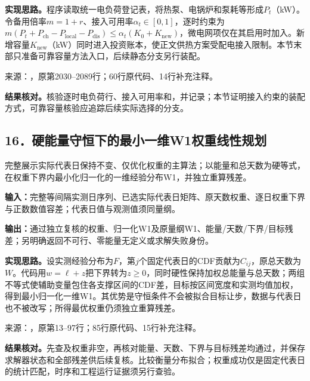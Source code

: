 \noindent\textbf{实现思路。}程序读取统一电负荷登记表，将热泵、电锅炉和泵耗等形成$P_t$（kW）。令备用倍率$m=1+r$、接入可用率$\alpha_t\in[0,1]$，逐时约束为$m(P_t+P_{\mathrm{ch}}-P_{\mathrm{local}}-P_{\mathrm{dis}})\le\alpha_t(K_0+K_{\mathrm{new}})$，微电网项仅在其启用时加入。新增容量$K_{\mathrm{new}}$（kW）同时进入投资账本，使正文供热方案受配电接入限制。本节末部只准备可靠容量方法入口，后续静态分支另行装配。

{\small 来源：，原第2030--2089行；60行原代码、14行补充注释。}\par

\begingroup
{}

\endgroup

\noindent\textbf{结果核对。}核验逐时电负荷行、接入可用率和，并记录；本节证明接入约束的装配方式，可靠容量核验应追踪后续实际选择的分支。

\subsection*{16．硬能量守恒下的最小一维W1权重线性规划}
完整展示实际代表日保持不变、仅优化权重的主算法；以能量和总天数为硬等式，在权重下界内最小化归一化的一维经验分布W1，并独立重算残差。

\noindent\textbf{输入：}完整等间隔实测日序列、已选实际代表日矩阵、原天数权重、逐日权重下界与正数数值容差；代表日值与观测值须同量纲。\par
\noindent\textbf{输出：}通过独立复核的权重、归一化W1及原量纲W1、能量/天数/下界/目标残差；另明确返回不可行、零能量无定义或求解失败身份。\par

\noindent\textbf{实现思路。}设实测经验分布为$F$，第$j$个固定代表日的CDF贡献为$C_{ij}$，原总天数为$W$。代码用$w=\ell+z$把下界转为$z\ge0$，同时硬性保持加权总能量与总天数；两组不等式使辅助变量包住各支撑区间的CDF差，目标按区间宽度和实测均值加权，得到最小归一化一维W1。其优势是守恒条件不会被拟合目标让步，数据与代表日也不被改写；所得最优权重仍须独立重算残差。

{\small 来源：，原第13--97行；85行原代码、15行补充注释。}\par

\begingroup
{}

\endgroup

\noindent\textbf{结果核对。}先查及权重非空，再核对能量、天数、下界与目标残差均通过，并保存求解器状态和全部残差供后续复核。比较衡量分布拟合；权重成功仅是固定代表日的统计匹配，时序和工程运行证据须另行查验。

